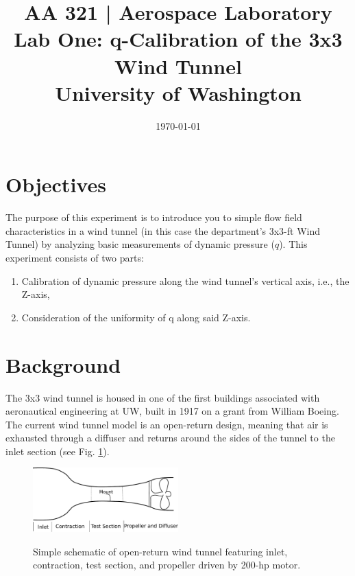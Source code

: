\documentclass[12pt]{article}
\begin{document}
\title{\Large {\bf AA 321 | Aerospace Laboratory\\Lab One: q-Calibration of the 3x3 Wind Tunnel}\\[1ex]
  University of Washington}
\date{\today}
\maketitle

\section{Objectives}\label{objs}
The purpose of this experiment is to introduce you to simple flow field characteristics in a wind tunnel (in this case the department’s 3x3-ft Wind Tunnel) by analyzing basic measurements of dynamic pressure ($q$). This experiment consists of two parts:
\begin{enumerate}
\item Calibration of dynamic pressure along the wind tunnel’s vertical axis, i.e., the Z-axis,
\item Consideration of the uniformity of q along said Z-axis.
\end{enumerate}

\section{Background}
The 3x3 wind tunnel is housed in one of the first buildings associated with aeronautical engineering at UW, built in 1917 on a grant from William Boeing. The current wind tunnel model is an open-return design, meaning that air is exhausted through a diffuser and returns around the sides of the tunnel to the inlet section (see Fig. \ref{tunnel}). 

\begin{figure}[h]
  \centering
  \includegraphics[width=0.5\textwidth]{tunnel}\\
  \caption{Simple schematic of open-return wind tunnel featuring inlet, contraction, test section, and propeller driven by 200-hp motor.}\label{tunnel}
\end{figure}
\end{document}
